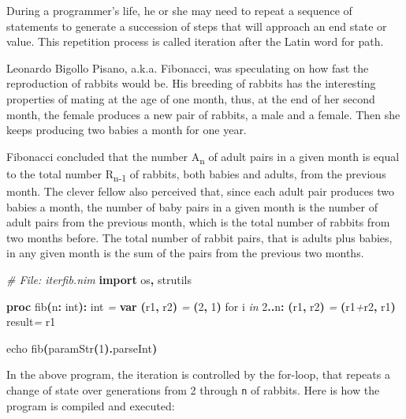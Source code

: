 \documentclass[
  12pt,
]{book}
\newenvironment{Shaded}{}{}
\newcommand{\CommentTok}[1]{\textcolor[rgb]{0.38,0.63,0.69}{\textit{#1}}}
\newcommand{\DataTypeTok}[1]{\textcolor[rgb]{0.56,0.13,0.00}{#1}}
\newcommand{\DecValTok}[1]{\textcolor[rgb]{0.25,0.63,0.44}{#1}}
\newcommand{\KeywordTok}[1]{\textcolor[rgb]{0.00,0.44,0.13}{\textbf{#1}}}
\newcommand{\NormalTok}[1]{#1}
\newcommand{\OtherTok}[1]{\textcolor[rgb]{0.00,0.44,0.13}{#1}}
\newcommand{\StringTok}[1]{\textcolor[rgb]{0.25,0.44,0.63}{#1}}
\begin{document}
During a programmer's life, he or she may need to repeat a sequence of
statements to generate a succession of steps that will approach an end
state or value. This repetition process is called iteration after the
Latin word for path.

Leonardo Bigollo Pisano, a.k.a. Fibonacci, was speculating on how fast
the reproduction of rabbits would be. His breeding of rabbits has the
interesting properties of mating at the age of one month, thus, at the
end of her second month, the female produces a new pair of rabbits, a
male and a female. Then she keeps producing two babies a month for one
year.

Fibonacci concluded that the number A\textsubscript{n} of adult pairs in
a given month is equal to the total number R\textsubscript{n-1} of
rabbits, both babies and adults, from the previous month. The clever
fellow also perceived that, since each adult pair produces two babies a
month, the number of baby pairs in a given month is the number of adult
pairs from the previous month, which is the total number of rabbits from
two months before. The total number of rabbit pairs, that is adults plus
babies, in any given month is the sum of the pairs from the previous two
months.

\begin{Shaded}
\begin{Highlighting}[]
\CommentTok{\# File: iterfib.nim}
\KeywordTok{import}\NormalTok{ os}\KeywordTok{,}\NormalTok{ strutils}

\KeywordTok{proc }\StringTok{fib}\KeywordTok{(}\NormalTok{n}\KeywordTok{:} \DataTypeTok{int}\KeywordTok{):} \DataTypeTok{int} \CommentTok{=}
  \KeywordTok{var} \KeywordTok{(}\NormalTok{r1}\KeywordTok{,}\NormalTok{ r2}\KeywordTok{)} \CommentTok{=} \KeywordTok{(}\DecValTok{2}\KeywordTok{,} \DecValTok{1}\KeywordTok{)}
  \DataTypeTok{for}\NormalTok{ i }\CommentTok{in} \DecValTok{2}\KeywordTok{..}\NormalTok{n}\KeywordTok{:}
    \KeywordTok{(}\NormalTok{r1}\KeywordTok{,}\NormalTok{ r2}\KeywordTok{)} \CommentTok{=} \KeywordTok{(}\NormalTok{r1}\CommentTok{+}\NormalTok{r2}\KeywordTok{,}\NormalTok{ r1}\KeywordTok{)}
  \OtherTok{result}\CommentTok{=}\NormalTok{ r1}

\DataTypeTok{echo} \DataTypeTok{fib}\KeywordTok{(}\DataTypeTok{paramStr}\KeywordTok{(}\DecValTok{1}\KeywordTok{).}\DataTypeTok{parseInt}\KeywordTok{)}
\end{Highlighting}
\end{Shaded}

In the above program, the iteration is controlled by the for-loop, that
repeats a change of state over generations from 2 through \texttt{n} of
rabbits. Here is how the program is compiled and executed:
\end{document}
